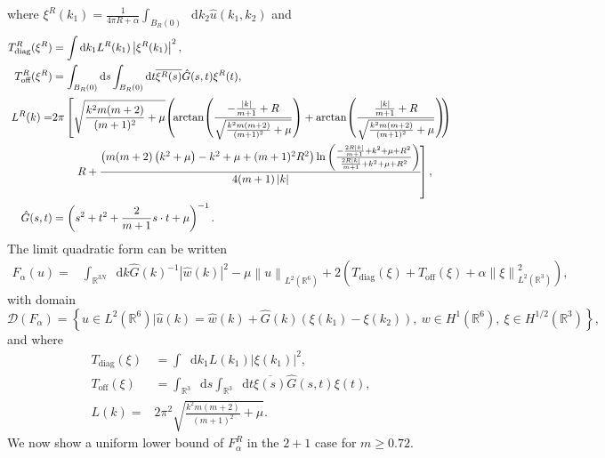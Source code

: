\documentclass[a4paper,11pt]{article}
\newcommand{\norm}[1]{\left\lVert #1 \right\rVert}
\newcommand{\abs}[1]{\left\lvert #1 \right\rvert}
\newcommand{\dom}[1]{\mathscr D\left(#1\right)}
\newcommand*\diff{\mathop{}\!\mathrm{d}}
\newcommand{\R}{\mathbb{R}}
\numberwithin{equation}{section}
\begin{document}
where $ \xi^R(k_1)=\frac{1}{4\pi R+\alpha}\int_{B_R(0)}\diff k_2 \hat{u}(k_1,k_2) $ and \begin{equation}
\begin{aligned}
T^R_{\text{diag}}(\xi^R)&=\int\diff k_1 L^R(k_1)\abs{\xi^R(k_1)}^2,\\ T^R_{\text{off}}(\xi^R)&=\int_{B_R(0)}\diff s\int_{B_R(0)}\diff t\overline{\xi^R(s)}\hat{G}(s,t)\xi^R(t),\\
L^R(k)=&2 \pi  \left[\sqrt{\frac{k^2 m (m+2)}{(m+1)^2}+\mu }\! \left(\!\arctan\!\left(\frac{-\frac{\left| k\right|}{m+1}+R}{ \sqrt{\frac{k^2 m (m+2)}{(m+1)^2}+\mu }}\right)+\arctan\!\left(\frac{\frac{\left| k\right| }{m+1}+R}{\sqrt{\frac{k^2 m (m+2)}{(m+1)^2}+\mu }}\right)\!\!\right)\vphantom{\frac{\ln\left(\frac{\frac{R}{R}}{\frac{R}{R}}\right)}{R}}\right.
\\&
\left.\qquad R+\frac{\left(m (m+2) \left(k^2+\mu \right)-k^2+\mu +(m+1)^2 R^2\right) \ln \left(\frac{-\frac{2 R \left| k\right| }{m+1}+k^2+\mu +R^2}{\frac{2 R \left| k\right| }{m+1}+k^2+\mu
		+R^2}\right)}{4(m+1) \left| k\right| }\!\right],\\
\hat{G}(s,t)&=\left(s^2+t^2+\frac{2}{m+1}s\cdot t+\mu\right)^{-1}.
\end{aligned}
\end{equation}
 The limit quadratic form can be written 
\begin{equation}
\begin{aligned}
F_\alpha(u)=&\int_{\R^{3N}}\diff k \hat{G}(k)^{-1}|\hat{w}(k)|^2-\mu\norm{u}_{L^2(\R^{6})}+2\left(T_{\text{diag}}(\xi)+T_{\text{off}}(\xi)+\alpha\norm{\xi}_{L^2(\R^{3})}^2\right),
\end{aligned}
\end{equation}
with domain \begin{equation}
\dom{F_\alpha}=\left\{u\in L^2(\R^6)\vert \hat{u}(k)=\hat{w}(k)+\hat{G}(k)\left(\xi(k_1)-\xi(k_2)\right),\ w\in H^1(\R^6),\ \xi\in H^{1/2}(\R^3) \right\},
\end{equation}
and where \begin{equation}
\begin{aligned}
T_{\text{diag}}(\xi)&=\int\diff k_1 L(k_1)\abs{\xi(k_1)}^2,\\ T_{\text{off}}(\xi)&=\int_{\R^3}\diff s\int_{\R^3}\diff t\overline{\xi(s)}\hat{G}(s,t)\xi(t),\\
L(k)=&2 \pi^2 \sqrt{\frac{k^2 m (m+2)}{(m+1)^2}+\mu }.
\end{aligned}
\end{equation}
We now show a uniform lower bound of $ F_\alpha^R $  in the $ 2+1 $ case for $ m\geq0.72 $. 
\end{document}
